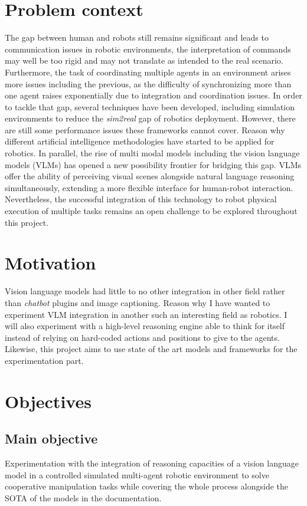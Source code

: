 \section{Problem context}
The gap between human and robots still remains significant and leads to communication issues in robotic environments, the interpretation of commands may well be too rigid and may not translate as intended to the real scenario. Furthermore, the task of coordinating multiple agents in an environment arises more issues including the previous, as the difficulty of synchronizing more than one agent raises exponentially due to integration and coordination issues. In order to tackle that gap, several techniques have been developed, including simulation environments to reduce the \textit{sim2real} gap of robotics deployment. However, there are still some performance issues these frameworks cannot cover. Reason why different artificial intelligence methodologies have started to be applied for robotics. In parallel, the rise of multi modal models including the vision language models (VLMs) has opened a new possibility frontier for bridging this gap. VLMs offer the ability of perceiving visual scenes alongside natural language reasoning simultaneously, extending a more flexible interface for human-robot interaction. Nevertheless, the successful integration of this technology to robot physical execution of multiple tasks remains an open challenge to be explored throughout this project. 

\section{Motivation}
Vision language models had little to no other integration in other field rather than \textit{chatbot} plugins and image captioning. Reason why I have wanted to experiment VLM integration in another such an interesting field as robotics. I will also experiment with a high-level reasoning engine able to think for itself instead of relying on hard-coded actions and positions to give to the agents. Likewise, this project aims to use state of the art models and frameworks for the experimentation part. 

\section{Objectives}
\subsection{Main objective}
Experimentation with the integration of reasoning capacities of a vision language model in a controlled simulated multi-agent robotic environment to solve cooperative manipulation tasks while covering the whole process alongside the SOTA of the models in the documentation.

